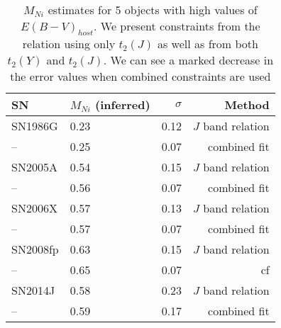 \begin{table}
\begin{center}
\caption{$M_{Ni}$ estimates for 5 objects with high values of $E(B-V)_{host}$. We present constraints from the relation using only $t_2(J)$ as well as from both $t_2(Y)$ and $t_2(J)$. We can see a marked decrease in the error values when combined constraints are used}
\begin{tabular}{llrr}
\hline
SN & $M_{Ni}$ (inferred) & $\sigma$ & Method \\
\hline
SN1986G	& 0.23 & 0.12	& $J$ band relation \\
-- &	0.25	& 0.07	& combined fit \\
SN2005A	& 0.54	&  0.15   & $J$ band relation \\
-- &	0.56	& 0.07	& combined fit \\
SN2006X	& 0.57 & 0.13 &	$J$ band relation \\
-- &	0.57	& 0.07	& combined fit \\
SN2008fp & 0.63	& 0.15 & $J$ band relation \\
-- 	 & 0.65	& 0.07	& cf		\\
SN2014J	& 0.58	& 0.23 & $J$ band relation\\
--	& 0.59  & 0.17 & combined fit \\
\hline
\end{tabular}
\end{center}
\label{tab:red}
\end{table}
